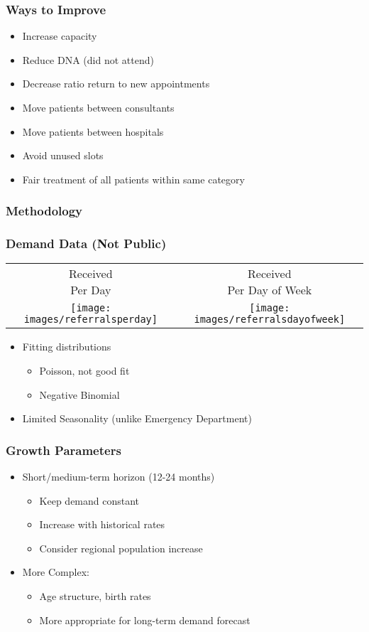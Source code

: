 \documentclass[dvipsnames]{beamer}
\begin{document}
\begin{frame}
\frametitle{Ways to Improve}
\begin{itemize}
\item Increase capacity
\item Reduce DNA (did not attend)
\item Decrease ratio return to new appointments
\item Move patients between consultants
\item Move patients between hospitals
\item Avoid unused slots
\item Fair treatment of all patients within same category
\end{itemize}
\end{frame}

\begin{frame}
\frametitle{Methodology}

\end{frame}

\begin{frame}
\frametitle{Demand Data (Not Public)}
\begin{tabular}{cc}
\shortstack{Received\\Per Day}&
\shortstack{Received\\Per Day of Week}\\
\texttt{[image: images/referralsperday]} &
\texttt{[image: images/referralsdayofweek]}
\end{tabular}

{\small
\begin{itemize}
\item Fitting distributions
\begin{itemize}
\item Poisson, not good fit
\item Negative Binomial
\end{itemize}
\item Limited Seasonality (unlike Emergency Department)
\end{itemize}
}
\end{frame}

\begin{frame}
\frametitle{Growth Parameters}
\begin{itemize}
\item Short/medium-term horizon (12-24 months)
\begin{itemize}
\item Keep demand constant
\item Increase with historical rates
\item Consider regional population increase 
\end{itemize}
\item More Complex:
\begin{itemize}
\item Age structure, birth rates
\item More appropriate for long-term demand forecast
\end{itemize}
\end{itemize}
\end{frame}
\end{document}
